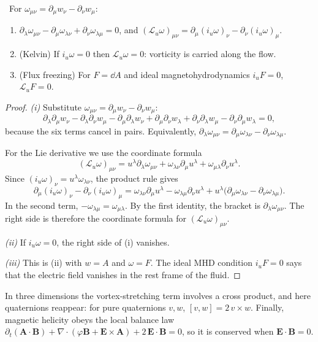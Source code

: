 \begin{theorem}\label{thm:kelvin}\ver\
For $\omega_{\mu\nu}=\partial_\mu w_\nu-\partial_\nu w_\mu$:
\begin{enumerate}[label=(\roman*)]
\item $\partial_\lambda\omega_{\mu\nu}-\partial_\mu\omega_{\lambda\nu}+\partial_\nu\omega_{\lambda\mu}=0$, and $(\mathcal L_u\omega)_{\mu\nu}=\partial_\mu(i_u\omega)_\nu-\partial_\nu(i_u\omega)_\mu$.
\item (Kelvin) If $i_u\omega=0$ then $\mathcal L_u\omega=0$: vorticity is carried along the flow.
\item (Flux freezing) For $F=\dd A$ and ideal magnetohydrodynamics $i_uF=0$, $\mathcal L_uF=0$.
\end{enumerate}
\end{theorem}
\begin{proof}
\emph{(i)} Substitute $\omega_{\mu\nu}=\partial_\mu w_\nu-\partial_\nu w_\mu$:
\[
\partial_\lambda\partial_\mu w_\nu-\partial_\lambda\partial_\nu w_\mu-\partial_\mu\partial_\lambda w_\nu+\partial_\mu\partial_\nu w_\lambda+\partial_\nu\partial_\lambda w_\mu-\partial_\nu\partial_\mu w_\lambda=0 ,
\]
because the six terms cancel in pairs. Equivalently, $\partial_\lambda\omega_{\mu\nu}=\partial_\mu\omega_{\lambda\nu}-\partial_\nu\omega_{\lambda\mu}$.

For the Lie derivative we use the coordinate formula
\[
(\mathcal L_u\omega)_{\mu\nu}=u^\lambda\partial_\lambda\omega_{\mu\nu}+\omega_{\lambda\nu}\partial_\mu u^\lambda+\omega_{\mu\lambda}\partial_\nu u^\lambda .
\]
Since $(i_u\omega)_\nu=u^\lambda\omega_{\lambda\nu}$, the product rule gives
\[
\partial_\mu(i_u\omega)_\nu-\partial_\nu(i_u\omega)_\mu
=\omega_{\lambda\nu}\partial_\mu u^\lambda-\omega_{\lambda\mu}\partial_\nu u^\lambda+u^\lambda\bigl(\partial_\mu\omega_{\lambda\nu}-\partial_\nu\omega_{\lambda\mu}\bigr).
\]
In the second term, $-\omega_{\lambda\mu}=\omega_{\mu\lambda}$. By the first identity, the bracket is $\partial_\lambda\omega_{\mu\nu}$. The right side is therefore the coordinate formula for $(\mathcal L_u\omega)_{\mu\nu}$.

\emph{(ii)} If $i_u\omega=0$, the right side of (i) vanishes.

\emph{(iii)} This is (ii) with $w=A$ and $\omega=F$. The ideal MHD condition $i_uF=0$ says that the electric field vanishes in the rest frame of the fluid.
\end{proof}


In three dimensions the vortex-stretching term involves a cross product, and here quaternions reappear: for pure quaternions $v,w$, $[v,w]=2\,v\times w$. Finally, magnetic helicity obeys the local balance law $\partial_t(\mathbf A\cdot\mathbf B)+\nabla\cdot(\varphi\mathbf B+\mathbf E\times\mathbf A)+2\,\mathbf E\cdot\mathbf B=0$, so it is conserved when $\mathbf E\cdot\mathbf B=0$.

